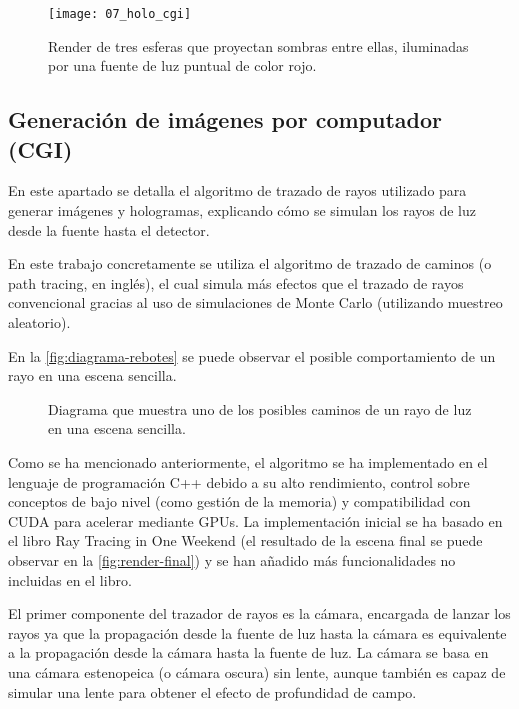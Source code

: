 \documentclass[10pt, a4paper]{article}
\begin{document}
\begin{figure}[H]
    \centering 
    \texttt{[image: 07\_holo\_cgi]}
    \caption{Render de tres esferas que proyectan sombras entre ellas, iluminadas por una fuente de luz puntual de color rojo.}
    \label{fig:holograma-cgi}
\end{figure}

\subsection{Generación de imágenes por computador (CGI)}

En este apartado se detalla el algoritmo de trazado de rayos utilizado para generar imágenes y hologramas, explicando cómo se simulan los rayos de luz desde la fuente hasta el detector.

En este trabajo concretamente se utiliza el algoritmo de trazado de caminos (o path tracing, en inglés), el cual simula más efectos que el trazado de rayos convencional gracias al uso de simulaciones de Monte Carlo (utilizando muestreo aleatorio).

En la \autoref{fig:diagrama-rebotes} se puede observar el posible comportamiento de un rayo en una escena sencilla.

\begin{figure}[H]
    \centering 
    

    \caption{Diagrama que muestra uno de los posibles caminos de un rayo de luz en una escena sencilla.}
    \label{fig:diagrama-rebotes}
\end{figure}

Como se ha mencionado anteriormente, el algoritmo se ha implementado en el lenguaje de programación C++ debido a su alto rendimiento, control sobre conceptos de bajo nivel (como gestión de la memoria) y compatibilidad con CUDA para acelerar mediante GPUs. La implementación inicial se ha basado en el libro Ray Tracing in One Weekend \cite{Shirley:2024} (el resultado de la escena final se puede observar en la \autoref{fig:render-final}) y se han añadido más funcionalidades no incluidas en el libro.

El primer componente del trazador de rayos es la cámara, encargada de lanzar los rayos ya que la propagación desde la fuente de luz hasta la cámara es equivalente a la propagación desde la cámara hasta la fuente de luz. La cámara se basa en una cámara estenopeica (o cámara oscura) sin lente, aunque también es capaz de simular una lente para obtener el efecto de profundidad de campo.
\end{document}
